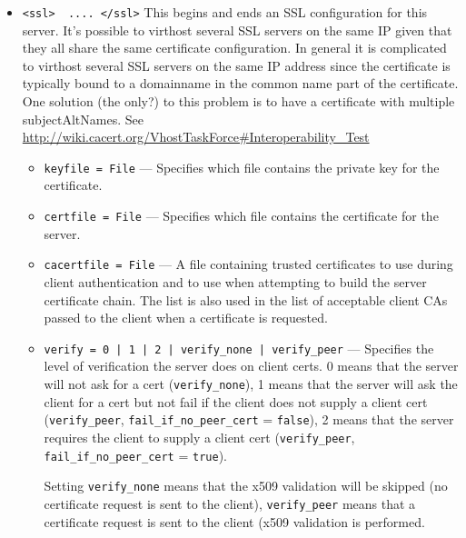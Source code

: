 \documentclass[11pt,oneside,english]{book}
\begin{document}
\begin{itemize}
\item        \verb+<ssl>  .... </ssl>+
               This begins and ends an SSL configuration for this server. It's
               possible to virthost several SSL servers on the same IP given
               that they all share the same certificate configuration. In
               general it is complicated to virthost several SSL servers on the
               same IP address since the certificate is typically bound to a
               domainname in the common name part of the certificate. One
               solution (the only?)  to this problem is to have a certificate
               with multiple subjectAltNames. See
               \url{http://wiki.cacert.org/VhostTaskForce#Interoperability_Test}

               \begin{itemize}
               \item \verb+keyfile = File+ --- Specifies which file contains the
                 private key for the certificate.

               \item \verb+certfile = File+ --- Specifies which file contains
                 the certificate for the server.

               \item \verb+cacertfile = File+ --- A file containing trusted
                 certificates to use during client authentication and to use
                 when attempting to build the server certificate chain. The list
                 is also used in the list of acceptable client CAs passed to the
                 client when a certificate is requested.

               \item \verb+verify = 0 | 1 | 2 | verify_none | verify_peer+ ---
                 Specifies the level of verification the server does on client
                 certs. 0 means that the server will not ask for a cert
                 (\verb+verify_none+), 1 means that the server will ask the
                 client for a cert but not fail if the client does not supply a
                 client cert (\verb+verify_peer+, \verb+fail_if_no_peer_cert+ =
                 \verb+false+), 2 means that the server requires the client to
                 supply a client cert (\verb+verify_peer+,
                 \verb+fail_if_no_peer_cert+ = \verb+true+).

                 Setting \verb+verify_none+ means that the x509 validation will
                 be skipped (no certificate request is sent to the client),
                 \verb+verify_peer+ means that a certificate request is sent to
                 the client (x509 validation is performed.


\end{itemize}
\end{itemize}
\end{document}
